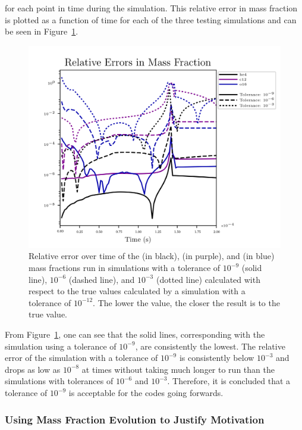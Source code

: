\documentclass[preprint]{aastex62}
\begin{document}
      \noindent for each point in time during the simulation. This relative error in mass fraction is plotted as a function of time for each of the three testing simulations and can be seen in Figure~\ref{fig:relativeerror}.
    
      \begin{figure}
        \centering
        \includegraphics[width=5in]{images/react_aprox13_test13_ureca_tol-rel_xn1.png}
        \caption{Relative error over time of the  (in black),  (in purple), and  (in blue) mass fractions run in simulations with a tolerance of $10^{-9}$ (solid line), $10^{-6}$ (dashed line), and $10^{-3}$ (dotted line) calculated with respect to the true values calculated by a simulation with a tolerance of $10^{-12}$. The lower the value, the closer the result is to the true value.
          }
        \label{fig:relativeerror}
      \end{figure}  
  
      From Figure~\ref{fig:relativeerror}, one can see that the solid lines, corresponding with the simulation using a tolerance of $10^{-9}$, are consistently the lowest. The relative error of the simulation with a tolerance of $10^{-9}$ is consistently below $10^{-3}$ and drops as low as $10^{-8}$ at times without taking much longer to run than the simulations with tolerances of $10^{-6}$ and $10^{-3}$. Therefore, it is concluded that a tolerance of $10^{-9}$ is acceptable for the codes going forwards. 
  
    \subsubsection{Using Mass Fraction Evolution to Justify Motivation}
    
\end{document}
